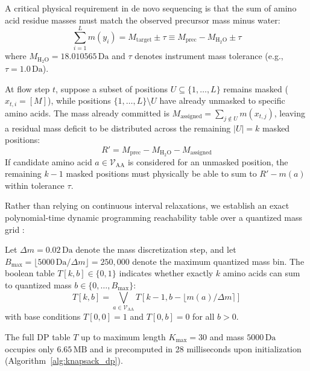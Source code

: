 A critical physical requirement in de novo sequencing is that the sum of amino acid residue masses must match the observed precursor mass minus water:
\begin{equation}
\sum_{i=1}^L m(y_i) = M_{\text{target}} \pm \tau \equiv M_{\text{prec}} - M_{\text{H}_2\text{O}} \pm \tau
\label{eq:mass_conservation_constraint}
\end{equation}
where $M_{\text{H}_2\text{O}} = 18.010565\,\text{Da}$ and $\tau$ denotes instrument mass tolerance (e.g., $\tau = 1.0\,\text{Da}$).

At flow step $t$, suppose a subset of positions $U \subseteq \{1, \dots, L\}$ remains masked ($x_{t, i} = [M]$), while positions $\{1, \dots, L\} \setminus U$ have already unmasked to specific amino acids. The mass already committed is $M_{\text{assigned}} = \sum_{j \notin U} m(x_{t, j})$, leaving a residual mass deficit to be distributed across the remaining $|U| = k$ masked positions:
\begin{equation}
R' = M_{\text{prec}} - M_{\text{H}_2\text{O}} - M_{\text{assigned}}
\label{eq:residual_mass}
\end{equation}
If candidate amino acid $a \in \mathcal{V}_{\text{AA}}$ is considered for an unmasked position, the remaining $k-1$ masked positions must physically be able to sum to $R' - m(a)$ within tolerance $\tau$.

Rather than relying on continuous interval relaxations, we establish an exact polynomial-time dynamic programming reachability table over a quantized mass grid \citep{Dancik1999, Chen2001}:

\begin{defn}
Let $\Delta m = 0.02\,\text{Da}$ denote the mass discretization step, and let $B_{\max} = \lfloor 5000\,\text{Da} / \Delta m \rfloor = 250{,}000$ denote the maximum quantized mass bin. The boolean table $T[k, b] \in \{0, 1\}$ indicates whether exactly $k$ amino acids can sum to quantized mass $b \in \{0, \dots, B_{\max}\}$:
\begin{equation}
T[k, b] = \bigvee_{a \in \mathcal{V}_{\text{AA}}} T[k-1, b - \lfloor m(a) / \Delta m \rceil]
\label{eq:knapsack_dp_recurrence}
\end{equation}
with base conditions $T[0, 0] = 1$ and $T[0, b] = 0$ for all $b > 0$.
\end{defn}

The full DP table $T$ up to maximum length $K_{\max} = 30$ and mass $5000\,\text{Da}$ occupies only $6.65\,\text{MB}$ and is precomputed in 28 milliseconds upon initialization (Algorithm~\ref{alg:knapsack_dp}).


